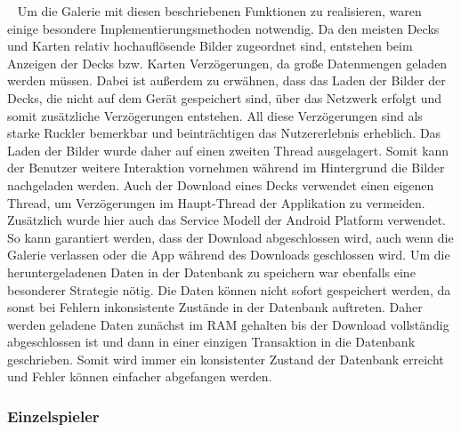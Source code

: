 \documentclass{scrartcl}
\begin{document}
\ \newline
Um die Galerie mit diesen beschriebenen Funktionen zu realisieren, waren einige
besondere Implementierungsmethoden notwendig. Da den meisten Decks und Karten
relativ hochauflösende Bilder zugeordnet sind, entstehen beim Anzeigen der Decks
bzw. Karten Verzögerungen, da große Datenmengen geladen werden müssen. Dabei ist
außerdem zu erwähnen, dass das Laden der Bilder der Decks, die nicht auf dem
Gerät gespeichert sind, über das Netzwerk erfolgt und somit zusätzliche
Verzögerungen entstehen. All diese Verzögerungen sind als starke Ruckler
bemerkbar und beinträchtigen das Nutzererlebnis erheblich. Das Laden der Bilder
wurde daher auf einen zweiten Thread ausgelagert. Somit kann der Benutzer
weitere Interaktion vornehmen während im Hintergrund die Bilder nachgeladen
werden. Auch der Download eines Decks verwendet einen eigenen Thread, um
Verzögerungen im Haupt-Thread der Applikation zu vermeiden. Zusätzlich wurde
hier auch das Service Modell der Android Platform verwendet. So kann garantiert
werden, dass der Download abgeschlossen wird, auch wenn die Galerie verlassen
oder die App während des Downloads geschlossen wird. Um die heruntergeladenen
Daten in der Datenbank zu speichern war ebenfalls eine besonderer Strategie
nötig. Die Daten können nicht sofort gespeichert werden, da sonst bei Fehlern
inkonsistente Zustände in der Datenbank auftreten. Daher werden geladene Daten
zunächst im RAM gehalten bis der Download vollständig abgeschlossen ist und dann
in einer einzigen Transaktion in die Datenbank geschrieben. Somit wird immer ein
konsistenter Zustand der Datenbank erreicht und Fehler können einfacher
abgefangen werden.

\subsubsection{Einzelspieler}
\end{document}
